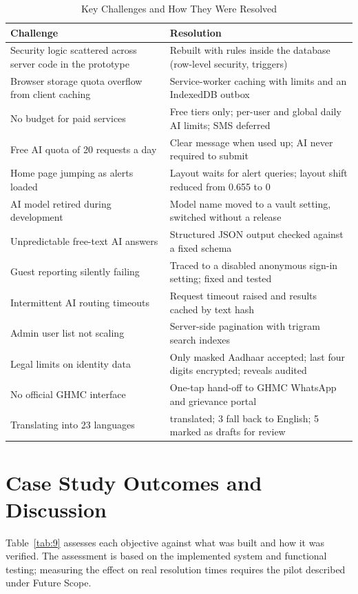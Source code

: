 \documentclass[conference]{IEEEtran}
\begin{document}
\begin{table}[htbp]
\caption{Key Challenges and How They Were Resolved}
\label{tab:8}
\begin{center}
\footnotesize
\begin{tabular}{|>{\raggedright\arraybackslash}p{}|>{\raggedright\arraybackslash}p{}|}
\hline
\textbf{Challenge} & \textbf{Resolution} \\
\hline
Security logic scattered across server code in the prototype & Rebuilt with rules inside the database (row-level security, triggers) \\ \hline
Browser storage quota overflow from client caching & Service-worker caching with limits and an IndexedDB outbox \\ \hline
No budget for paid services & Free tiers only; per-user and global daily AI limits; SMS deferred \\ \hline
Free AI quota of 20 requests a day & Clear message when used up; AI never required to submit \\ \hline
Home page jumping as alerts loaded & Layout waits for alert queries; layout shift reduced from 0.655 to 0 \\ \hline
AI model retired during development & Model name moved to a vault setting, switched without a release \\ \hline
Unpredictable free-text AI answers & Structured JSON output checked against a fixed schema \\ \hline
Guest reporting silently failing & Traced to a disabled anonymous sign-in setting; fixed and tested \\ \hline
Intermittent AI routing timeouts & Request timeout raised and results cached by text hash \\ \hline
Admin user list not scaling & Server-side pagination with trigram search indexes \\ \hline
Legal limits on identity data & Only masked Aadhaar accepted; last four digits encrypted; reveals audited \\ \hline
No official GHMC interface & One-tap hand-off to GHMC WhatsApp and grievance portal \\ \hline
Translating into 23 languages & 20 translated; 3 fall back to English; 5 marked as drafts for review \\ \hline
\end{tabular}
\end{center}
\end{table}
\section{Case Study Outcomes and Discussion}
Table~\ref{tab:9} assesses each objective against what was built and how it was verified. The assessment is based on the implemented system and functional testing; measuring the effect on real resolution times requires the pilot described under Future Scope.
\end{document}

